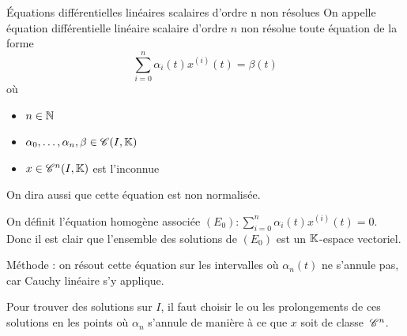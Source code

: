 \lvspace \avspace \begin{definitionnt}{\'Equations différentielles linéaires scalaires d'ordre n non résolues}{}
    On appelle équation différentielle linéaire scalaire d'ordre $n$ non résolue toute
    équation de la forme
    $$\sum_{i=0}^{n} \alpha_i(t) x^{(i)}(t) = \beta(t)$$
    où 
    \begin{itemize}
        \item $n \in \mathbb{N}$
        \item $\alpha_0, \dots, \alpha_n, \beta \in \mathscr C(I, \mathbb{K})$
        \item $x \in \mathscr C^n(I, \mathbb{K})$ est l'inconnue
    \end{itemize}

    On dira aussi que cette équation est non normalisée. 

    On définit l'équation homogène associée $(E_0) : \sum_{i = 0}^{n} \alpha_i(t) x^{(i)}(t) = 0$.
    Donc il est clair que l'ensemble des solutions de $(E_0)$ est un $\mathbb{K}$-espace vectoriel.
\end{definitionnt}

Méthode : on résout cette équation sur les intervalles où $\alpha_n(t)$ ne s'annule pas, car 
Cauchy linéaire s'y applique. 

Pour trouver des solutions sur $I$, il faut choisir le ou les prolongements de ces solutions 
en les points où $\alpha_n$ s'annule de manière à ce que $x$ soit de classe $\,\mathscr C^{n}$.

